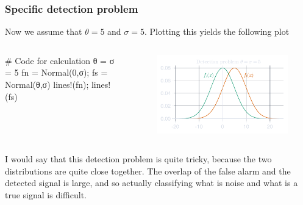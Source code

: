 \documentclass[compress,aspectratio=169]{beamer}
\begin{document}
\begin{frame}[fragile] %
    \frametitle{Specific detection problem}
    Now we assume that $\theta = 5$ and $\sigma = 5$. Plotting this yields the 
    following plot
    \begin{columns}
        \begin{column}{0.5\textwidth}
            \begin{jllisting}[gobble=16]
                # Code for calculation
                θ = σ = 5
                fn = Normal(0,σ); fs = Normal(θ,σ)
                lines!(fn); lines!(fs)
            \end{jllisting}
        \end{column}
        \begin{column}{0.5\textwidth}
            \begin{figure}
                \includegraphics[width=\columnwidth]{"../b.pdf"}
            \end{figure}
        \end{column}
    \end{columns}
    I would say that this detection problem is quite tricky, because the two
    distributions are quite close together. The overlap of the false alarm and
    the detected signal is large, and so actually classifying what is noise
    and what is a true signal is difficult.
\end{frame} 
\end{document}
